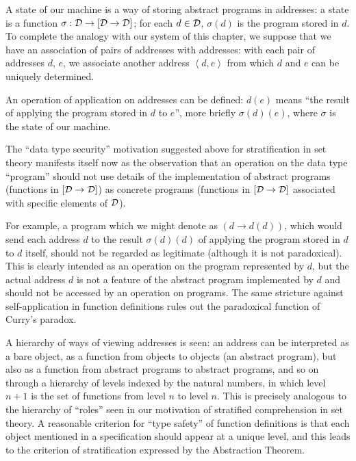 A state of our machine is a way of storing abstract programs in
addresses: a state is a function $\sigma: {\cal D} \rightarrow [{\cal
D} \rightarrow {\cal D}]$; for each $d \in {\cal D}$, $\sigma(d)$ is
the program stored in $d$.  To complete the analogy with our system of
this chapter, we suppose that we have an association of pairs of
addresses with addresses: with each pair of addresses $d$, $e$, we
associate another address $\left<d,e\right>$ from which $d$
and $e$ can be uniquely determined.

An operation of application on addresses can be defined: $d(e)$ means
``the result of applying the program stored in $d$ to $e$'', more
briefly $\sigma(d)(e)$, where $\sigma$ is the state of our machine.

The ``data type security'' motivation
suggested above for 
stratification in set theory manifests itself now as the
observation 
that an operation on the data type ``program'' should not use details
of the implementation of abstract programs (functions in
$[{\cal D} 
\rightarrow {\cal D}]$) as concrete programs (functions in $[{\cal D}
\rightarrow {\cal D}]$ associated with specific elements of $\cal D$).

For example, a program which we might denote as $(d \rightarrow
d(d))$, which would send each address $d$ to the result $\sigma(d)(d)$
of applying the program stored in $d$ to $d$ itself, should not be
regarded as legitimate (although it is not paradoxical).  This
is 
clearly intended as an operation on the program represented by $d$,
but the actual address $d$ is not a feature of the abstract program
implemented by $d$ and should not be accessed by an operation on
programs.  The same stricture against self-application in function
definitions rules out the paradoxical function of Curry's paradox.

A hierarchy of ways of viewing addresses is seen: an address can be
interpreted as a bare object, as a function from objects to objects
(an abstract program), but also as a function from abstract programs
to abstract programs, and so on through a hierarchy of levels indexed
by the natural numbers, in which level $n+1$ is the set
of functions 
from level $n$ to level $n$.  This is precisely analogous to the
hierarchy of ``roles'' seen in our motivation of
stratified 
comprehension in set theory.  A reasonable criterion for
``type 
safety'' of function definitions is that each object mentioned in a
specification should appear at a unique level, and this leads to the
criterion of stratification expressed by the
Abstraction Theorem. 


